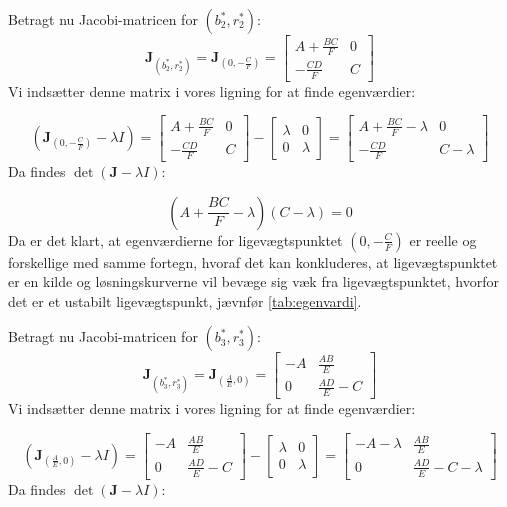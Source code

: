 Betragt nu Jacobi-matricen for $(b^*_2,r^*_2)$:
\begin{equation*}
    \textbf{J}_{\left(b^*_2,r^*_2 \right)} =
    \textbf{J}_{\left(0,-\frac{C}{F}\right)} =
        \begin{bmatrix}
        A + \frac{BC}{F} &  0\\
        -\frac{CD}{F} & C
        \end{bmatrix}
\end{equation*}
Vi indsætter denne matrix i vores ligning for at finde egenværdier:

$$
    \left(\textbf{J}_{\left(0,-\frac{C}{F}\right)}-\lambda I\right) =
        \begin{bmatrix}
        A + \frac{BC}{F} &  0\\
        -\frac{CD}{F} & C
        \end{bmatrix}-
    \begin{bmatrix}
    \lambda & 0\\
    0 & \lambda
    \end{bmatrix} =
        \begin{bmatrix}
        A + \frac{BC}{F} - \lambda &  0\\
        -\frac{CD}{F} & C - \lambda
        \end{bmatrix}
$$
Da findes $\det(\textbf{J}-\lambda I)$:

$$\left( A + \frac{BC}{F} - \lambda\right)(C - \lambda) = 0$$
Da er det klart, at egenværdierne for ligevægtspunktet $(0, -\frac{C}{F})$ er reelle og forskellige med samme fortegn, hvoraf det kan konkluderes, at ligevægtspunktet er en kilde og løsningskurverne vil bevæge sig væk fra ligevægtspunktet, hvorfor det er et ustabilt ligevægtspunkt, jævnfør \ref{tab:egenvardi}.
\hfill \break

Betragt nu Jacobi-matricen for $(b^*_3,r^*_3)$:
\begin{equation*}    
   \textbf{J}_{\left(b^*_3,r^*_3 \right)} =
    \textbf{J}_{\left(\frac{A}{E},0\right)} =
        \begin{bmatrix}
        -A &  \frac{AB}{E}\\
        0 & \frac{AD}{E}-C
        \end{bmatrix}
\end{equation*}
Vi indsætter denne matrix i vores ligning for at finde egenværdier:

$$
    \left(\textbf{J}_{\left(\frac{A}{E},0\right)}-\lambda I\right) =
        \begin{bmatrix}
        -A &  \frac{AB}{E}\\
        0 & \frac{AD}{E}-C
        \end{bmatrix}-
    \begin{bmatrix}
    \lambda & 0\\
    0 & \lambda
    \end{bmatrix} =
        \begin{bmatrix}
        -A - \lambda &  \frac{AB}{E}\\
        0 & \frac{AD}{E}-C-\lambda
        \end{bmatrix}
$$
Da findes $\det(\textbf{J}-\lambda I)$:

